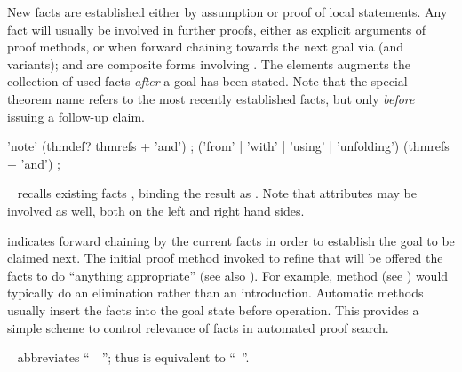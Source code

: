 \begin{isabellebody}
\begin{isamarkuptext}
  New facts are established either by assumption or proof of local
  statements.  Any fact will usually be involved in further proofs,
  either as explicit arguments of proof methods, or when forward
  chaining towards the next goal via \hyperlink{command.then}{\mbox{}} (and variants);
  \hyperlink{command.from}{\mbox{}} and \hyperlink{command.with}{\mbox{}} are composite forms
  involving \hyperlink{command.note}{\mbox{}}.  The \hyperlink{command.using}{\mbox{}} elements
  augments the collection of used facts \emph{after} a goal has been
  stated.  Note that the special theorem name \hyperlink{fact.this}{\mbox{}} refers
  to the most recently established facts, but only \emph{before}
  issuing a follow-up claim.

  \begin{rail}
    'note' (thmdef? thmrefs + 'and')
    ;
    ('from' | 'with' | 'using' | 'unfolding') (thmrefs + 'and')
    ;
  \end{rail}

  \begin{description}

  \item \hyperlink{command.note}{\mbox{}}~ recalls existing facts
  , binding the result as .  Note that
  attributes may be involved as well, both on the left and right hand
  sides.

  \item \hyperlink{command.then}{\mbox{}} indicates forward chaining by the current
  facts in order to establish the goal to be claimed next.  The
  initial proof method invoked to refine that will be offered the
  facts to do ``anything appropriate'' (see also
  ).  For example, method \hyperlink{method.rule}{\mbox{}}
  (see ) would typically do an elimination
  rather than an introduction.  Automatic methods usually insert the
  facts into the goal state before operation.  This provides a simple
  scheme to control relevance of facts in automated proof search.
  
  \item \hyperlink{command.from}{\mbox{}}~ abbreviates ``\hyperlink{command.note}{\mbox{}}~~\hyperlink{command.then}{\mbox{}}''; thus \hyperlink{command.then}{\mbox{}} is
  equivalent to ``\hyperlink{command.from}{\mbox{}}~''.
  

\end{description}
\end{isamarkuptext}
\end{isabellebody}
